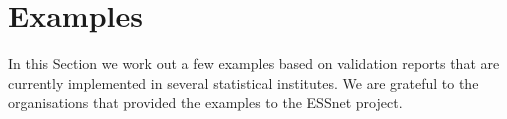 \section{Examples}
In this Section we work out a few examples based on validation reports that are 
currently implemented in several statistical institutes. We are grateful to the
organisations that provided the examples to the ESSnet project.



\newpage

